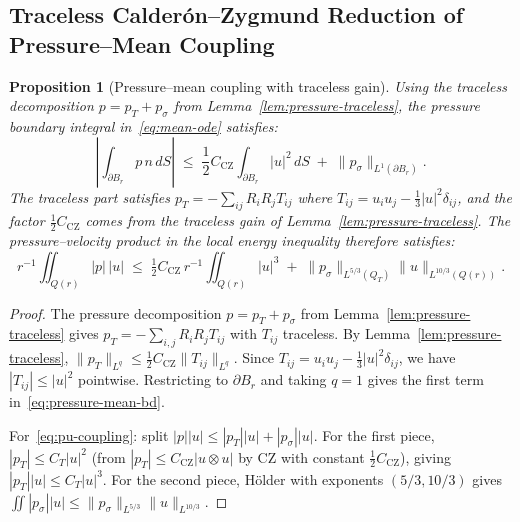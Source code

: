 \documentclass[11pt]{article}
\newtheorem{proposition}[theorem]{Proposition}
\theoremstyle{definition}
\theoremstyle{remark}
\begin{document}
\subsection{Traceless Calderón--Zygmund Reduction of Pressure--Mean Coupling}

\begin{proposition}[Pressure--mean coupling with traceless gain]
\label{prop:pressure-mean}
  Using the traceless decomposition $p = p_T + p_\sigma$ from
  Lemma~\ref{lem:pressure-traceless}, the pressure boundary integral in~\eqref{eq:mean-ode}
  satisfies:
  \begin{equation}\label{eq:pressure-mean-bd}
    \left|\int_{\partial B_r}\!p\,n\,dS\right|
    \;\leq\; \frac{1}{2}C_{\mathrm{CZ}}\int_{\partial B_r}\!\!|u|^2\,dS
             \;+\; \|p_\sigma\|_{L^1(\partial B_r)}.
  \end{equation}
  The traceless part satisfies $p_T = -\sum_{ij}R_iR_j T_{ij}$ where $T_{ij}=u_iu_j-\tfrac{1}{3}|u|^2\delta_{ij}$,
  and the factor $\tfrac{1}{2}C_{\mathrm{CZ}}$ comes from the traceless gain of
  Lemma~\ref{lem:pressure-traceless}.
  The pressure--velocity product in the local energy inequality therefore satisfies:
  \begin{equation}\label{eq:pu-coupling}
    r^{-1}\iint_{Q(r)}\!\!|p|\,|u|
    \;\leq\; \tfrac{1}{2}C_{\mathrm{CZ}}\,r^{-1}\iint_{Q(r)}\!\!|u|^3
             \;+\; \|p_\sigma\|_{L^{5/3}(Q_T)}\|u\|_{L^{10/3}(Q(r))}.
  \end{equation}
\end{proposition}

\begin{proof}
  The pressure decomposition $p = p_T + p_\sigma$ from Lemma~\ref{lem:pressure-traceless}
  gives $p_T = -\sum_{i,j}R_iR_j T_{ij}$ with $T_{ij}$ traceless.
  By Lemma~\ref{lem:pressure-traceless}, $\|p_T\|_{L^q}\leq\tfrac{1}{2}C_{\mathrm{CZ}}\|T_{ij}\|_{L^q}$.
  Since $T_{ij} = u_iu_j - \tfrac{1}{3}|u|^2\delta_{ij}$, we have $|T_{ij}|\leq|u|^2$ pointwise.
  Restricting to $\partial B_r$ and taking $q=1$ gives the first term
  in~\eqref{eq:pressure-mean-bd}.

  For~\eqref{eq:pu-coupling}: split $|p||u| \leq |p_T||u| + |p_\sigma||u|$.
  For the first piece, $|p_T|\leq C_T|u|^2$ (from $|p_T|\leq C_{\mathrm{CZ}}|u\otimes u|$
  by CZ with constant $\tfrac{1}{2}C_{\mathrm{CZ}}$), giving $|p_T||u|\leq C_T|u|^3$.
  For the second piece, Hölder with exponents $(5/3, 10/3)$ gives
  $\iint|p_\sigma||u|\leq\|p_\sigma\|_{L^{5/3}}\|u\|_{L^{10/3}}$.
\end{proof}
\end{document}
